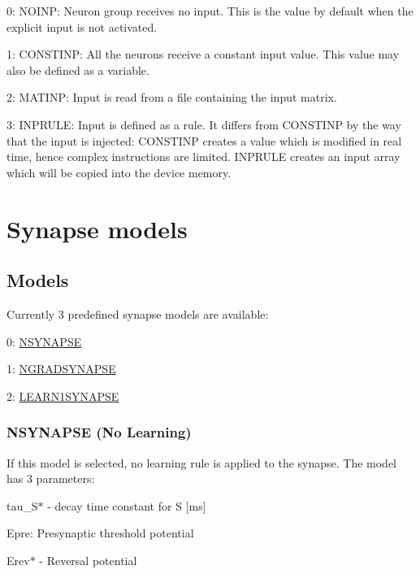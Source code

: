 \begin{DoxyItemize}
\item 0\+: N\+O\+I\+N\+P\+: Neuron group receives no input. This is the value by default when the explicit input is not activated.
\item 1\+: C\+O\+N\+S\+T\+I\+N\+P\+: All the neurons receive a constant input value. This value may also be defined as a variable.
\item 2\+: M\+A\+T\+I\+N\+P\+: Input is read from a file containing the input matrix.
\item 3\+: I\+N\+P\+R\+U\+L\+E\+: Input is defined as a rule. It differs from C\+O\+N\+S\+T\+I\+N\+P by the way that the input is injected\+: C\+O\+N\+S\+T\+I\+N\+P creates a value which is modified in real time, hence complex instructions are limited. I\+N\+P\+R\+U\+L\+E creates an input array which will be copied into the device memory.
\end{DoxyItemize}\hypertarget{Manual_sect3}{}\section{Synapse models}\label{Manual_sect3}
\hypertarget{Manual_subsect31}{}\subsection{Models}\label{Manual_subsect31}
Currently 3 predefined synapse models are available\+:
\begin{DoxyItemize}
\item 0\+: \hyperlink{Manual_sect31}{N\+S\+Y\+N\+A\+P\+S\+E}
\item 1\+: \hyperlink{Manual_sect32}{N\+G\+R\+A\+D\+S\+Y\+N\+A\+P\+S\+E}
\item 2\+: \hyperlink{Manual_sect33}{L\+E\+A\+R\+N1\+S\+Y\+N\+A\+P\+S\+E}
\end{DoxyItemize}\hypertarget{Manual_sect31}{}\subsubsection{N\+S\+Y\+N\+A\+P\+S\+E (\+No Learning)}\label{Manual_sect31}
If this model is selected, no learning rule is applied to the synapse. The model has 3 parameters\+:
\begin{DoxyItemize}
\item {\ttfamily tau\+\_\+\+S$\ast$} -\/ decay time constant for S \mbox{[}ms\mbox{]}
\item {\ttfamily Epre\+:} Presynaptic threshold potential
\item {\ttfamily Erev$\ast$} -\/ Reversal potential
\end{DoxyItemize}

